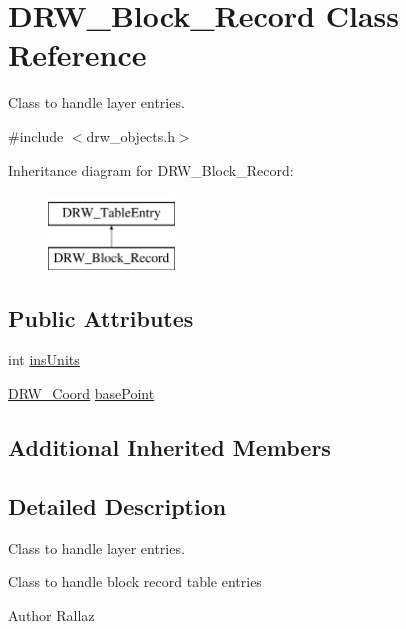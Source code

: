 \hypertarget{class_d_r_w___block___record}{}\section{D\+R\+W\+\_\+\+Block\+\_\+\+Record Class Reference}
\label{class_d_r_w___block___record}


Class to handle layer entries.  




{\ttfamily \#include $<$drw\+\_\+objects.\+h$>$}

Inheritance diagram for D\+R\+W\+\_\+\+Block\+\_\+\+Record\+:\begin{figure}[H]
\begin{center}
\leavevmode
\includegraphics[height=2.000000cm]{d9/db1/class_d_r_w___block___record}
\end{center}
\end{figure}
\subsection*{Public Attributes}
\begin{DoxyCompactItemize}
\item 
int \hyperlink{class_d_r_w___block___record_ad4a51c93d03294546b648f0b866577d7}{ins\+Units}
\item 
\hyperlink{class_d_r_w___coord}{D\+R\+W\+\_\+\+Coord} \hyperlink{class_d_r_w___block___record_a95b52334c0b306ac7c07f2d66f13d1cf}{base\+Point}
\end{DoxyCompactItemize}
\subsection*{Additional Inherited Members}


\subsection{Detailed Description}
Class to handle layer entries. 

Class to handle block record table entries \begin{DoxyAuthor}{Author}
Rallaz 
\end{DoxyAuthor}



